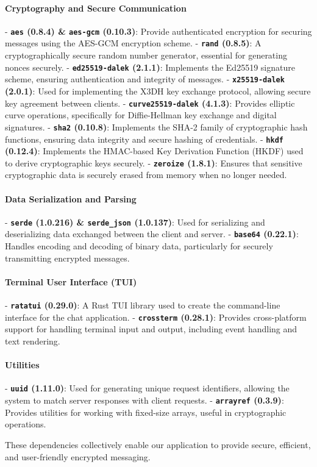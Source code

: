 \paragraph{Cryptography and Secure Communication}  
- \textbf{\texttt{aes} (0.8.4) \& \texttt{aes-gcm} (0.10.3)}: Provide authenticated encryption for securing messages using the AES-GCM encryption scheme.  
- \textbf{\texttt{rand} (0.8.5)}: A cryptographically secure random number generator, essential for generating nonces securely.  
- \textbf{\texttt{ed25519-dalek} (2.1.1)}: Implements the Ed25519 signature scheme, ensuring authentication and integrity of messages.  
- \textbf{\texttt{x25519-dalek} (2.0.1)}: Used for implementing the X3DH key exchange protocol, allowing secure key agreement between clients.  
- \textbf{\texttt{curve25519-dalek} (4.1.3)}: Provides elliptic curve operations, specifically for Diffie-Hellman key exchange and digital signatures.  
- \textbf{\texttt{sha2} (0.10.8)}: Implements the SHA-2 family of cryptographic hash functions, ensuring data integrity and secure hashing of credentials.  
- \textbf{\texttt{hkdf} (0.12.4)}: Implements the HMAC-based Key Derivation Function (HKDF) used to derive cryptographic keys securely.  
- \textbf{\texttt{zeroize} (1.8.1)}: Ensures that sensitive cryptographic data is securely erased from memory when no longer needed.  

\paragraph{Data Serialization and Parsing}  
- \textbf{\texttt{serde} (1.0.216) \& \texttt{serde\_json} (1.0.137)}: Used for serializing and deserializing data exchanged between the client and server.  
- \textbf{\texttt{base64} (0.22.1)}: Handles encoding and decoding of binary data, particularly for securely transmitting encrypted messages.  

\paragraph{Terminal User Interface (TUI)}  
- \textbf{\texttt{ratatui} (0.29.0)}: A Rust TUI library used to create the command-line interface for the chat application.  
- \textbf{\texttt{crossterm} (0.28.1)}: Provides cross-platform support for handling terminal input and output, including event handling and text rendering.  

\paragraph{Utilities}  
- \textbf{\texttt{uuid} (1.11.0)}: Used for generating unique request identifiers, allowing the system to match server responses with client requests.  
- \textbf{\texttt{arrayref} (0.3.9)}: Provides utilities for working with fixed-size arrays, useful in cryptographic operations.  

\noindent These dependencies collectively enable our application to provide secure, efficient, and user-friendly encrypted messaging.  


